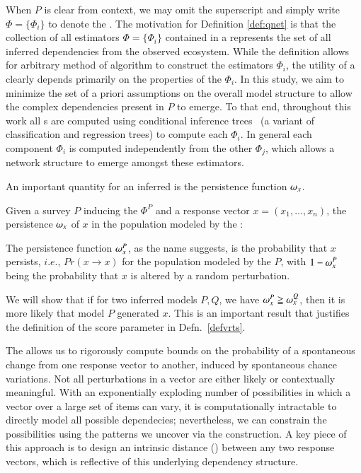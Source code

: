 \documentclass[onecolumn,10pt]{IEEEtran}
\def\x{x}
\begin{document}
When $P$ is clear from context, we may omit the superscript and simply write $\Phi = \{\Phi_i\}$ to denote the \qnet. The motivation for Definition \ref{def:qnet} is that the collection of all estimators $\Phi = \{ \Phi_i \}$ contained in a \qnet represents the set of all inferred dependencies from the observed ecosystem.  While the definition allows for arbitrary method of algorithm to construct the estimators $\Phi_i$, the utility of a \qnet clearly depends primarily on the properties of the $\Phi_i$.  In this study, we aim to minimize the set of a priori assumptions on the overall model structure to allow the complex dependencies present in $P$ to emerge. To that end, throughout this work all {\qnet}s are computed using conditional inference trees~\cite{sarda2017conditional} (a variant of classification and regression trees) to compute each $\Phi_i$. In general each \qnet component $\Phi_i$ is computed independently from the other $\Phi_j$, which allows a network structure to emerge amongst these estimators.

An important quantity for an inferred \qnet is the persistence function $\mem{\x}$.
% 
\begin{defn}\label{def:mem}
  Given a survey $P$ inducing the \qnet $\Phi^P$ and a response  vector $\x = (x_1, \ldots, x_n)$, the persistence $\mem{\x}$ of  $\x$ in the population modeled  by the \qnet:
  \cgather{
    \mem{\x}^P := \operatorname{Pr}(\x \in P) = \prod_{i=1}^n  \Phi^P_i(X_i = x_i\,|\,X_j = x_j, j \neq i) %
  }%
\end{defn}
The persistence function $\mem{\x}^P$, as the name suggests,  is the probability that $\x$ persists, $i.e.$,  $Pr(\x \rightarrow \x)$ for the population modeled by the \qnet $P$, with $1-\mem{\x}^P$ being the probability that $\x$ is altered by a  random perturbation.

We will show  that if for two inferred \qnet models $P,Q$, we have $\mem{\x}^P \geqq \mem{\x}^Q$, then it is more likely that model $P$ generated $\x$. This is an important result that justifies the definition of the
score parameter in Defn.~\ref{defvrts}.

The \qnet allows us to rigorously compute  bounds on  the probability of a spontaneous change from one response vector to another, induced by spontaneous chance variations. Not all perturbations in a vector are either likely or contextually meaningful. With an exponentially exploding number of possibilities in which a vector over a large set of items can vary, it is computationally intractable to directly model all possible dependecies; nevertheless, we can constrain the possibilities using the patterns we uncover via the \qnet construction.  A key piece of this approach is to design  an intrinsic distance (\qdist) between any two response vectors, which is reflective of this underlying  dependency structure.  
\end{document}
